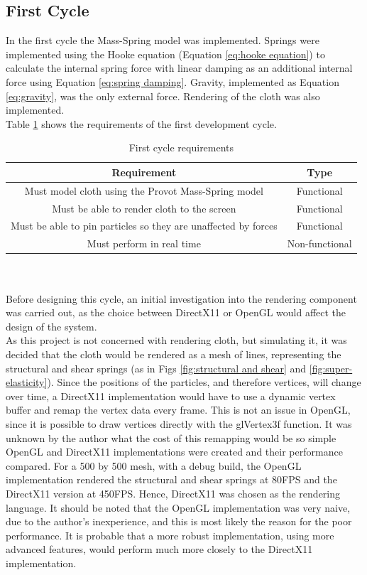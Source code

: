 \subsection{First Cycle}
In the first cycle the Mass-Spring model was implemented. Springs were implemented using the Hooke equation (Equation \ref{eq:hooke equation}) to calculate the internal spring force with linear damping as an additional internal force using Equation \ref{eq:spring damping}. Gravity, implemented as Equation \ref{eq:gravity}, was the only external force. Rendering of the cloth was also implemented.
\\Table \ref{tab:cycle 1 require} shows the requirements of the first development cycle.
\begin{table}[tp]
   \begin{minipage}{\textwidth}
      \begin{center}
         \begin{tabular}{c|c}
           Requirement & Type\\
           \hline
           Must model cloth using the Provot Mass-Spring model & Functional\\
           Must be able to render cloth to the screen & Functional\\
           Must be able to pin particles so they are unaffected by forces & Functional\\
           Must perform in real time& Non-functional\\
         \end{tabular}
      \end{center}
   \end{minipage}
   \caption{First cycle requirements}
   \label{tab:cycle 1 require}
\end{table}
\\\\Before designing this cycle, an initial investigation into the rendering component was carried out, as the choice between DirectX11 or OpenGL would affect the design of the system.
\\As this project is not concerned with rendering cloth, but simulating it, it was decided that the cloth would be rendered as a mesh of lines, representing the structural and shear springs (as in Figs \ref{fig:structural and shear} and \ref{fig:super-elasticity}). Since the positions of the particles, and therefore vertices, will change over time, a DirectX11 implementation would have to use a dynamic vertex buffer and remap the vertex data every frame. This is not an issue in OpenGL, since it is possible to draw vertices directly with the glVertex3f function. It was unknown by the author what the cost of this remapping would be so simple OpenGL and DirectX11 implementations were created and their performance compared. For a 500 by 500 mesh, with a debug build, the OpenGL implementation rendered the structural and shear springs at 80FPS and the DirectX11 version at 450FPS. Hence, DirectX11 was chosen as the rendering language. It should be noted that the OpenGL implementation was very naive, due to the author's inexperience, and this is most likely the reason for the poor performance. It is probable that a more robust implementation, using more advanced features, would perform much more closely to the DirectX11 implementation.
